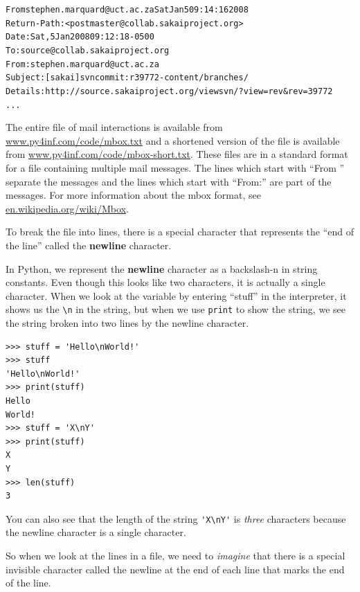 \beforeverb
\begin{alltt}
From stephen.marquard@uct.ac.za Sat Jan  5 09:14:16 2008
Return-Path: <postmaster@collab.sakaiproject.org>
Date: Sat, 5 Jan 2008 09:12:18 -0500
To: source@collab.sakaiproject.org
From: stephen.marquard@uct.ac.za
Subject: [sakai] svn commit: r39772 - content/branches/
Details: http://source.sakaiproject.org/viewsvn/?view=rev\&rev=39772
...
\end{alltt}
\afterverb

The entire file of mail interactions is available from 
\url{www.py4inf.com/code/mbox.txt} 
and a shortened version of the file is available from
\url{www.py4inf.com/code/mbox-short.txt}.
These files are in a standard format for a file containing 
multiple mail messages. The lines which start with 
``From '' separate the messages and the lines which start 
with ``From:'' are part of the messages. 
For more information about the mbox format, see 
\url{en.wikipedia.org/wiki/Mbox}. 

To break the file into lines, there is a special character that 
represents the ``end of the line'' called the {\bf newline} character.

In Python, we represent the {\bf newline} character as a backslash-n in 
string constants.  Even though this looks like two characters, it
is actually a single character.  When we look at the variable by entering
``stuff'' in the interpreter, it shows us the \verb"\n" in the string, 
but when we use {\tt print} to show the string, we see the string broken
into two lines by the newline character.

\beforeverb
\begin{verbatim}
>>> stuff = 'Hello\nWorld!'
>>> stuff
'Hello\nWorld!'
>>> print(stuff)
Hello
World!
>>> stuff = 'X\nY'
>>> print(stuff)
X
Y
>>> len(stuff)
3
\end{verbatim}
\afterverb
%

You can also see that the length of the string \verb"'X\nY'" is \emph{three}
characters because the newline character is a single character.

So when we look at the lines in a file, we need to \emph{imagine}
that there is a special invisible character called the newline at
the end of each line that marks the end of the line.  


